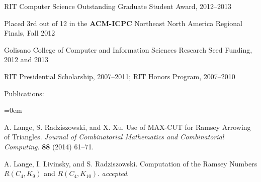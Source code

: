 \documentclass{article}
\begin{document}
\begin{reslist}
  \item RIT Computer Science Outstanding Graduate Student Award, 2012--2013
  \item Placed 3rd out of 12 in the {\bf ACM-ICPC} Northeast North America
Regional Finals, Fall 2012
  \item Golisano College of Computer and Information Sciences Research
    Seed Funding, 2012 and 2013
  \item RIT Presidential Scholarship, 2007--2011; RIT Honors Program,
    2007--2010%
\item {Publications}:\\[-1.75em]
\begin{enumerate}{\footnotesize {}
  \renewcommand{\labelenumi}{\theenumi}
  {\partopsep=0pt \topsep=0pt \leftmargin=0em \parskip=0pt}
  \setlength{\labelsep}{2pt}
  \setlength{\itemsep}{-3pt}
  \item A. Lange, S. Radziszowski, and X. Xu. Use of MAX-CUT for Ramsey
    Arrowing of Triangles. \emph{Journal of Combinatorial Mathematics
      and Combinatorial Computing}. \textbf{88} (2014) 61--71.
  \item A. Lange, I. Livinsky, and S. Radziszowski. Computation of the
      Ramsey Numbers $R(C_4,K_9)$ and $R(C_4,K_{10})$. \emph{accepted}.}
\end{enumerate}
\end{reslist}





\end{document}
